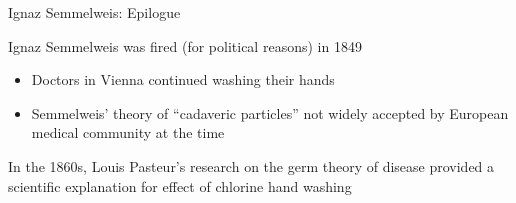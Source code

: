 \documentclass[10pt,xcolor=table,ignorenonframetext,handout,aspectratio=169]{beamer}
\newlength{\wideitemsep}
\let\olditem\item
\renewcommand{\item}{\setlength{\itemsep}{\wideitemsep}\olditem}
\begin{document}
\begin{frame}{Ignaz Semmelweis:  Epilogue}

\medskip
Ignaz Semmelweis was fired (for political reasons) in 1849

\medskip
\begin{itemize}
	
	\item Doctors in Vienna continued washing their hands
	
	\item Semmelweis' theory of ``cadaveric particles'' not widely accepted by European medical community at the time
	
\end{itemize}

\medskip
\medskip
In the 1860s, Louis Pasteur's research on the germ theory of disease provided a scientific explanation for effect of chlorine hand washing 

\end{frame}




\end{document}
